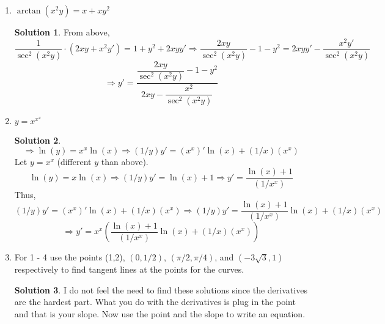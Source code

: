 \documentclass[10pt]{article}
\theoremstyle{Theorem}
\theoremstyle{definition}
\newtheorem*{solution}{Solution}
\theoremstyle{remark}
\theoremstyle{custom}
\begin{document}
\begin{enumerate}[1.]
\item $\arctan(x^2y)=x+xy^2$
\begin{solution}
From above,
\[
\dfrac{1}{\sec^2(x^2y)}\cdot (2xy+x^2y')=1+y^2+2xyy' \Rightarrow \dfrac{2xy}{\sec^2(x^2y)}-1-y^2=2xyy'-\dfrac{x^2y'}{\sec^2(x^2y)}
\]
\[
\Rightarrow y'=\dfrac{\dfrac{2xy}{\sec^2(x^2y)}-1-y^2}{2xy-\dfrac{x^2}{\sec^2(x^2y)}}
\]
\end{solution}
\item $y=x^{x^x}$
\begin{solution}
\[
\Rightarrow \ln(y)=x^x\ln(x) \Rightarrow (1/y)y'=(x^x)'\ln(x)+(1/x)(x^x)
\]
Let $y=x^x$ (different $y$ than above).
\[
\ln(y)=x\ln(x) \Rightarrow (1/y)y'=\ln(x)+1 \Rightarrow y'=\dfrac{\ln(x)+1}{(1/x^x)}
\]
Thus, 
\[
(1/y)y'=(x^x)'\ln(x)+(1/x)(x^x) \Rightarrow (1/y)y'=\dfrac{\ln(x)+1}{(1/x^x)}\ln(x)+(1/x)(x^x)
\]
\[
\Rightarrow y'=x^x\left(\dfrac{\ln(x)+1}{(1/x^x)}\ln(x)+(1/x)(x^x)\right)
\]
\end{solution}
\item For 1 - 4 use the points (1,2), $(0,1/2)$, $(\pi/2, \pi/4)$, and $(-3\sqrt{3},1)$ respectively to find tangent lines at the points for the curves.
\begin{solution}
I do not feel the need to find these solutions since the derivatives are the hardest part. What you do with the derivatives is plug in the point and that is your slope. Now use the point and the slope to write an equation.
\end{solution}

\end{enumerate}
\end{document}
